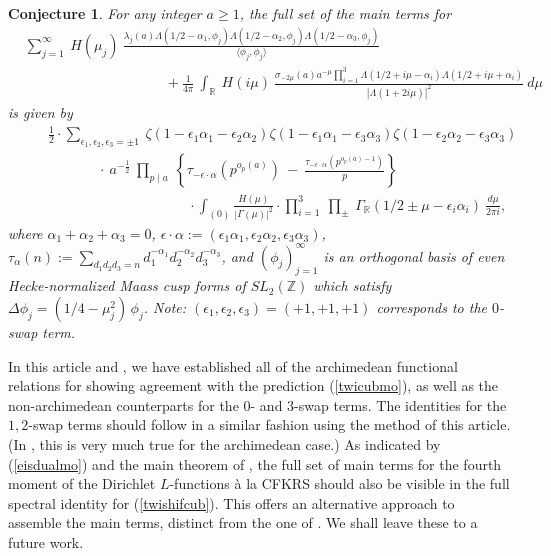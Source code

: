 \documentclass[11pt,reqno]{amsart}
\newtheorem{conj}[thm]{Conjecture}
\theoremstyle{definition}
\theoremstyle{definition}
\theoremstyle{remark}
\newcommand{\R}{\ensuremath{\mathbb{R}}}
\newcommand{\Z}{\ensuremath{\mathbb{Z}}}
\numberwithin{equation}{section}
\begin{document}
		\begin{conj}\label{twiscubconj}
			For any integer $a\ge 1$,  the full set of the main terms for 
			\vspace{0.1in}
			\begin{align}\label{twishifcub}
				& \sum_{j=1}^{\infty} \ H(\mu_{j}) \  \frac{ \lambda_{j}(a)\Lambda(1/2- \alpha_{1}, \phi_{j})\Lambda(1/2- \alpha_{2}, \phi_{j})\Lambda(1/2- \alpha_{3}, \phi_{j})}{\langle \phi_{j}, \phi_{j}\rangle} \nonumber\\
				&\hspace{120pt} + \frac{1}{4\pi } \ \int_{\R} \ H(i\mu) \ \frac{ \sigma_{-2\mu}(a) a^{-\mu}\prod\limits_{i=1}^{3}\Lambda(1/2+i\mu -\alpha_{i}) \Lambda(1/2+i\mu+ \alpha_{i})}{|\Lambda(1+2i\mu)|^2} \ d\mu
			\end{align}
			is given by
			\begin{align}\label{twicubmo}
				&\hspace{20pt}     \frac{ 1}{2} \cdot \sum_{\epsilon_{1}, \epsilon_{2}, \epsilon_{3}= \pm 1} \ \zeta(1 - \epsilon_{1}\alpha_{1}- \epsilon_{2}\alpha_{2})  \zeta(1 - \epsilon_{1}\alpha_{1}-\epsilon_{3}\alpha_{3})  \zeta(1 - \epsilon_{2}\alpha_{2}- \epsilon_{3}\alpha_{3})  \nonumber\\
				&\hspace{60pt} \ \cdot \	a^{-\frac{1}{2}}  \ \prod_{p\mid a} \ \left\{   \tau_{-\epsilon\cdot \alpha}\left(p^{o_{p}(a)}\right) \ - \   \frac{\tau_{-\epsilon\cdot\alpha}\left(p^{o_{p}(a)-1}\right) }{p} \right\} \nonumber\\
				&\hspace{140pt}  \cdot 	 \int_{(0)}  \frac{H(\mu)}{|\Gamma(\mu)|^2} \cdot \prod_{i=1}^{3} \ \prod_{\pm}  \ \Gamma_{\R}\left(1/2 \pm \mu -\epsilon_{i}\alpha_{i}\right) \ \frac{d\mu}{2\pi i},
			\end{align}
			where $\alpha_{1}+\alpha_{2}+\alpha_{3}=0$, $\epsilon \cdot \alpha := (\epsilon_{1}\alpha_{1}, \epsilon_{2}\alpha_{2}, \epsilon_{3}\alpha_{3})$,   $\tau_{\alpha}(n):= \sum\limits_{d_1d_2d_3 = n} d_1^{-\alpha_1} d_2^{-\alpha_2} d_3^{-\alpha_3} $, and $(\phi_{j})_{j=1}^{\infty}$ is an orthogonal basis of  even  Hecke-normalized  Maass cusp forms of $SL_{2}(\Z)$ which satisfy $\Delta\phi_{j}= ( 1/4-\mu_{j}^2) \, \phi_{j}$. Note: $(\epsilon_{1}, \epsilon_{2}, \epsilon_{3})= (+1, +1, +1)$ corresponds to the $0$-swap term. 
		\end{conj}


In this article and \cite{Kw23a+}, we have established all of the archimedean functional relations  for showing agreement with the prediction (\ref{twicubmo}),  as well as the non-archimedean counterparts for the $0$- and $3$-swap terms.  The identities for the $1,2$-swap terms should follow in a similar fashion using the method of this article. (In \cite{Kw23a+}, this is very much true for the archimedean case.)  As indicated  by (\ref{eisdualmo}) and the main theorem of \cite{Kw23a+},  the full set of  main terms for the fourth moment of the Dirichlet $L$-functions  \`{a} la CFKRS should also be visible in the full spectral identity for (\ref{twishifcub}). This offers an alternative approach to  assemble the main terms,  distinct from the one of  \cite{Y11}. We shall leave these to a future work.  
\end{document}
